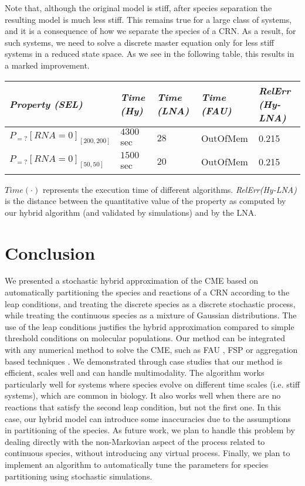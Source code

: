 \documentclass{llncs}
\begin{document}
Note that, although the original model is stiff, after species separation the resulting model is much less stiff. This remains true for a large class of systems, and it is a consequence of how we separate the  species of a CRN. As a result, for such systems, we need to solve a discrete master equation only for less stiff systems in a reduced state space. As we see in the following table, this results in a marked improvement.
{\footnotesize\begin{center}
	\begin{tabular}{|l|l|l|l|l|}
	\hline
	\emph{Property (SEL)}               &  		\emph{Time (Hy)}	 	 &   	\emph{Time (LNA)}	 	 &   	\emph{Time (FAU)}	 	  &    \emph{RelErr (Hy-LNA)}  	     \\ 
	\hline
	$P_{=?}[RNA=0]_{[200,200]}$        & 		  $4300$ sec         & $28$  	 & 	 	OutOfMem   &  0.215   \\ 
	$P_{=?}[RNA=0]_{[50,50]}$        &   	  $1500$ sec   &  $20$	&      	  	 	OutOfMem   &  0.215  \\ 
 
	\hline
	\end{tabular}
\end{center}}
$Time(\cdot)$ represents the execution time of different algorithms. \emph{RelErr(Hy-LNA)} is the distance between the quantitative value of the property as computed by our hybrid algorithm (and validated by simulations) and by the LNA.


\section{Conclusion}

We presented a stochastic hybrid approximation of the CME based on automatically partitioning the species and reactions of a CRN according to the leap conditions, and treating the discrete species as a discrete stochastic process, while treating the continuous species as a mixture of Gaussian distributions. 
The use of the leap conditions justifies the hybrid approximation compared to simple threshold conditions on molecular populations.
Our method can be integrated with any numerical method to solve the CME, such as FAU \cite{didier2009fast}, FSP \cite{munsky2006finite} or aggregation based techniques \cite{abate2015adaptive}.
We demonstrated through case studies that our method is efficient, scales well and can handle multimodality. The algorithm works particularly well for systems where species evolve on different time scales (i.e. stiff systems), which are common in biology.
{It also works well when there are no reactions that satisfy the second leap condition, but not the first one. In this case, our hybrid model can introduce some inaccuracies due to the assumptions in partitioning of the species. As future work, we plan to handle this problem by dealing directly with the non-Markovian aspect of the process related to continuous species, without introducing any virtual process. Finally, we plan to implement an algorithm to automatically tune the parameters for species partitioning using stochastic simulations.
}
\end{document}
